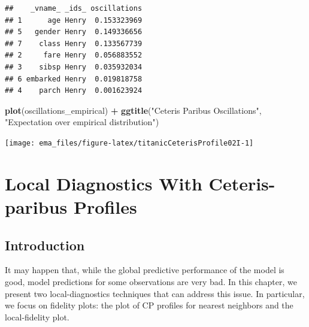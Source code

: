 \documentclass[12pt,]{krantz}
\newenvironment{Shaded}{\begin{snugshade}}{\end{snugshade}}
\newcommand{\DataTypeTok}[1]{\textcolor[rgb]{0.13,0.29,0.53}{#1}}
\newcommand{\KeywordTok}[1]{\textcolor[rgb]{0.13,0.29,0.53}{\textbf{#1}}}
\newcommand{\NormalTok}[1]{#1}
\newcommand{\OperatorTok}[1]{\textcolor[rgb]{0.81,0.36,0.00}{\textbf{#1}}}
\newcommand{\StringTok}[1]{\textcolor[rgb]{0.31,0.60,0.02}{#1}}
\begin{document}
\begin{Shaded}
\end{Shaded}

\begin{verbatim}
##    _vname_ _ids_ oscillations
## 1      age Henry  0.153323969
## 5   gender Henry  0.149336656
## 7    class Henry  0.133567739
## 2     fare Henry  0.056883552
## 3    sibsp Henry  0.035932034
## 6 embarked Henry  0.019818758
## 4    parch Henry  0.001623924
\end{verbatim}

\begin{Shaded}
\begin{Highlighting}[]
\KeywordTok{plot}\NormalTok{(oscillations_empirical) }\OperatorTok{+}\StringTok{ }\KeywordTok{ggtitle}\NormalTok{(}\StringTok{"Ceteris Paribus Oscillations"}\NormalTok{, }\StringTok{"Expectation over empirical distribution"}\NormalTok{)}
\end{Highlighting}
\end{Shaded}

\begin{center}\texttt{[image: ema\_files/figure-latex/titanicCeterisProfile02I-1]} \end{center}

\hypertarget{localDiagnostics}{%
\section{Local Diagnostics With Ceteris-paribus Profiles}\label{localDiagnostics}}

\hypertarget{cPLocDiagIntro}{%
\subsection{Introduction}\label{cPLocDiagIntro}}

It may happen that, while the global predictive performance of the model is good, model predictions for some observations are very bad. In this chapter, we present two local-diagnostics techniques that can address this issue. In particular, we focus on fidelity plots: the plot of CP profiles for nearest neighbors and the local-fidelity plot.
\end{document}
